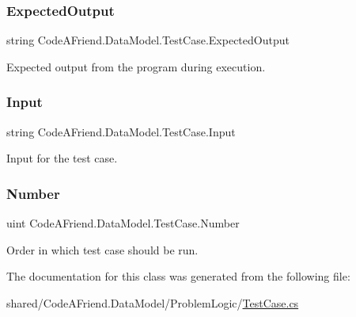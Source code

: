 \subsubsection{\texorpdfstring{Expected\+Output}{ExpectedOutput}}
{\footnotesize\ttfamily string Code\+A\+Friend.\+Data\+Model.\+Test\+Case.\+Expected\+Output\hspace{0.3cm}{\ttfamily [get]}}



Expected output from the program during execution.

\mbox{\label{class_code_a_friend_1_1_data_model_1_1_test_case_adb2e92070940ad2783a54837beccfa9c}} 
\subsubsection{\texorpdfstring{Input}{Input}}
{\footnotesize\ttfamily string Code\+A\+Friend.\+Data\+Model.\+Test\+Case.\+Input\hspace{0.3cm}{\ttfamily [get]}}



Input for the test case.

\mbox{\label{class_code_a_friend_1_1_data_model_1_1_test_case_a863e62751e85efd8d074eeb1ab4404e3}} 
\subsubsection{\texorpdfstring{Number}{Number}}
{\footnotesize\ttfamily uint Code\+A\+Friend.\+Data\+Model.\+Test\+Case.\+Number\hspace{0.3cm}{\ttfamily [get]}}



Order in which test case should be run.



The documentation for this class was generated from the following file\+:\begin{DoxyCompactItemize}
\item 
shared/\+Code\+A\+Friend.\+Data\+Model/\+Problem\+Logic/\mbox{\hyperlink{_test_case_8cs}{Test\+Case.\+cs}}\end{DoxyCompactItemize}
